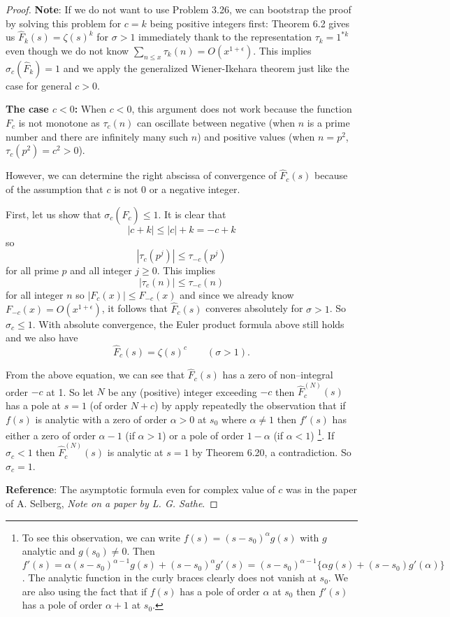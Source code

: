 \documentclass[12pt]{article}
\newcommand{\Fhat}{\widehat{F}}
\begin{document}
\begin{proof}
\textbf{Note}: If we do not want to use Problem 3.26, we can bootstrap the proof by solving this problem for $c = k$ being positive integers first: Theorem 6.2 gives us $\Fhat_k(s) = \zeta(s)^k$ for $\sigma > 1$ immediately thank to the representation $\tau_k = 1^{*k}$ even though we do not know $\sum_{n \leq x} \tau_k(n) = O(x^{1 + \epsilon})$. This implies $\sigma_c(\Fhat_k) = 1$ and we apply the generalized Wiener-Ikehara theorem just like the case for general $c > 0$.

\noindent \textbf{The case $c < 0$:} When $c < 0$, this argument does not work because the function $F_c$ is not monotone as $\tau_c(n)$ can oscillate between negative (when $n$ is a prime number and there are infinitely many such $n$) and positive values (when $n = p^2$, $\tau_c(p^2) = c^2 > 0$).

However, we can determine the right abscissa of convergence of $\Fhat_c(s)$ because of the assumption that $c$ is not 0 or a negative integer.

First, let us show that $\sigma_c(\Fhat_c) \leq 1$. It is clear that
$$|c + k| \leq |c| + k = -c + k$$
so
$$|\tau_c(p^j)| \leq \tau_{-c}(p^j)$$
for all prime $p$ and all integer $j \geq 0$. This implies
$$|\tau_c(n)| \leq \tau_{-c}(n)$$
for all integer $n$ so $|F_c(x)| \leq F_{-c}(x)$ and since we already know $F_{-c}(x) = O(x^{1 + \epsilon})$, it follows that $\Fhat_c(s)$ converes absolutely for $\sigma > 1$. So $\sigma_c \leq 1$. With absolute convergence, the Euler product formula above still holds and we also have
$$\Fhat_c(s) = \zeta(s)^c \qquad (\sigma > 1).$$

From the above equation, we can see that $\Fhat_c(s)$ has a zero of non--integral order $-c$ at 1. So let $N$ be any (positive) integer exceeding $-c$ then $\Fhat_c^{(N)}(s)$ has a pole at $s = 1$ (of order $N + c$) by apply repeatedly the observation that if $f(s)$ is analytic with a zero of order $\alpha > 0$ at $s_0$ where $\alpha \not= 1$ then $f'(s)$ has either a zero of order $\alpha - 1$ (if $\alpha > 1$) or a pole of order $1 - \alpha$ (if $\alpha < 1$)
\footnote{To see this observation, we can write $f(s) = (s - s_0)^\alpha g(s)$ with $g$ analytic and $g(s_0) \not= 0$. Then $f'(s) = \alpha (s - s_0)^{\alpha - 1} g(s) + (s - s_0)^\alpha g'(s) = (s - s_0)^{\alpha - 1} \{ \alpha g(s) + (s - s_0) g'(\alpha) \}$. The analytic function in the curly braces clearly does not vanish at $s_0$. We are also using the fact that if $f(s)$ has a pole of order $\alpha$ at $s_0$ then $f'(s)$ has a pole of order $\alpha + 1$ at $s_0$.}.
If $\sigma_c < 1$ then $\Fhat_c^{(N)}(s)$ is analytic at $s = 1$ by Theorem 6.20, a contradiction. So $\sigma_c = 1$.

\textbf{Reference}: The asymptotic formula even for complex value of $c$ was in the paper of A. Selberg, \textit{Note on a paper by L. G. Sathe}.
\end{proof}

\unless\ifdefined\IsMainDocument
\end{document}
